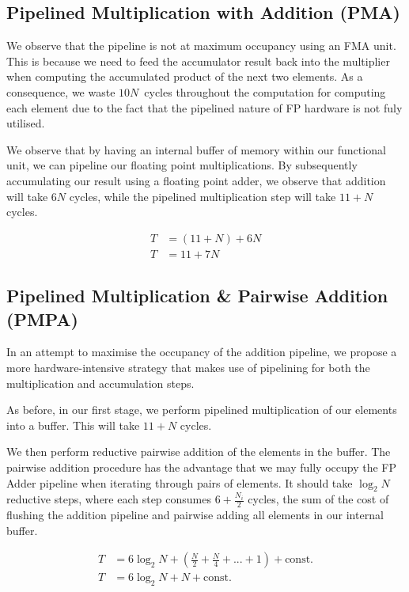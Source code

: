 \documentclass[a4paper,8pt]{report}
\begin{document}

\subsection{Pipelined Multiplication with Addition (PMA)}
We observe that the pipeline is not at maximum occupancy using an FMA unit. This
is because we need to feed the accumulator result back into the multiplier when
computing the accumulated product of the next two elements. As a consequence, we
waste $10N$~cycles throughout the computation for computing each element due to
the fact that the pipelined nature of FP hardware is not fuly utilised.

We observe that by having an internal buffer of memory within our functional
unit, we can pipeline our floating point multiplications. By subsequently
accumulating our result using a floating point adder, we observe that addition
will take $6N$ cycles, while the pipelined multiplication step will take $11+N$
cycles.

\begin{align*}
  T &= (11 + N) + 6N \\
  T &= 11 + 7N
\end{align*}
\subsection{Pipelined Multiplication \& Pairwise Addition (PMPA)}
In an attempt to maximise the occupancy of the addition pipeline, we propose a
more hardware-intensive strategy that makes use of pipelining for both the
multiplication and accumulation steps.

As before, in our first stage, we perform pipelined multiplication of our
elements into a buffer. This will take $11+N$ cycles.

We then perform reductive pairwise addition of the elements in the buffer.
The pairwise addition procedure has the advantage that we may fully occupy the
FP Adder pipeline when iterating through pairs of elements.
It should take $\log_2{N}$ reductive steps, where each step consumes
$6+\frac{N_{i}}{2}$ cycles, the sum of the cost of flushing the
addition pipeline and pairwise adding all elements in our internal buffer.

\begin{align*}
  T &= 6\log_2{N} + \left(\frac{N}{2} + \frac{N}{4} + ... + 1\right) + \text{const.}\\
  T &= 6\log_2{N} + N + \text{const.}
\end{align*}
\end{document}
